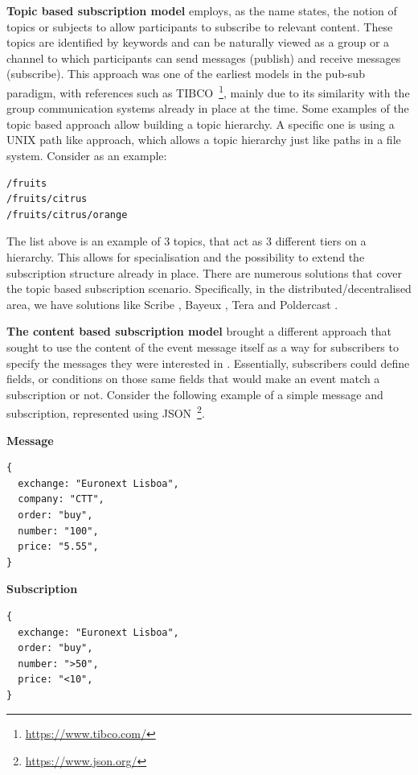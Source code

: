 \textbf{Topic based subscription model} employs, as the name states, the
notion of topics or subjects to allow participants to subscribe to
relevant content. These topics are identified by keywords and can be
naturally viewed as a group or a channel to which participants can send
messages (publish) and receive messages (subscribe). This approach was
one of the earliest models in the pub-sub paradigm, with references
such as TIBCO~\footnote{\url{https://www.tibco.com/}}, mainly due to its similarity with the group
communication systems already in place at the time. Some examples of the
topic based approach allow building a topic hierarchy. A specific one is
using a UNIX path like approach, which allows a topic hierarchy
just like paths in a file system. Consider as an example:

\begin{verbatim}
/fruits
/fruits/citrus
/fruits/citrus/orange
\end{verbatim}

The list above is an example of 3 topics, that act as 3 different tiers
on a hierarchy. This allows for specialisation and the possibility to
extend the subscription structure already in place. There are numerous
solutions that cover the topic based subscription scenario. Specifically,
in the distributed/decentralised area, we have solutions like Scribe \cite{Castro2002},
Bayeux \cite{Zhuang2001}, Tera \cite{Baldoni2007} and Poldercast \cite{Setty2012}.
\bigskip

\textbf{The content based subscription model} brought a different
approach that sought to use the content of the event message itself as a
way for subscribers to specify the messages they were interested in \cite{Banavar1999}.
Essentially, subscribers could define fields, or conditions on those same fields that would make an event
match a subscription or not. Consider the following example of a simple
message and subscription, represented using JSON~\footnote{\url{https://www.json.org/}}.
\bigskip

\textbf{Message}

\begin{verbatim}
{
  exchange: "Euronext Lisboa",
  company: "CTT",
  order: "buy",
  number: "100",
  price: "5.55",
}
\end{verbatim}

\textbf{Subscription}

\begin{verbatim}
{
  exchange: "Euronext Lisboa",
  order: "buy",
  number: ">50",
  price: "<10",
}
\end{verbatim}


